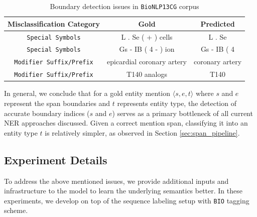 \begin{itemize}
    \begin{table}[h!]
    \centering
    \begin{tabular}{|c|c|c|}\hline
    	\textbf{Misclassification Category} & \textbf{Gold} & \textbf{Predicted}\\\hline
    	\texttt{Special Symbols} & L . Se ( + ) cells & L . Se\\\hline
    	\texttt{Special Symbols} & Gs - IB ( 4 - ) ion & Gs - IB ( 4\\\hline
    	\texttt{Modifier Suffix/Prefix} & epicardial coronary artery & coronary artery\\\hline
    	\texttt{Modifier Suffix/Prefix} & T140 analogs & T140\\\hline
    	\end{tabular}
        \caption{Boundary detection issues in \texttt{BioNLP13CG} corpus}
        \label{tab:boundary_issue}
    \end{table}
\end{itemize}

In general, we conclude that for a gold entity mention $\langle s, e, t \rangle$ where $s$ and $e$ represent the span boundaries and $t$ represents entity type, the detection of accurate boundary indices ($s$ and $e$) serves as a primary bottleneck of all current NER approaches discussed. Given a correct mention span, classifying it into an entity type $t$ is relatively simpler, as observed in Section \ref{sec:span_pipeline}.

\subsection{Experiment Details}

To address the above mentioned issues, we provide additional inputs and infrastructure to the model to learn the underlying semantics better. In these experiments, we develop on top of the sequence labeling setup with \texttt{BIO} tagging scheme.

